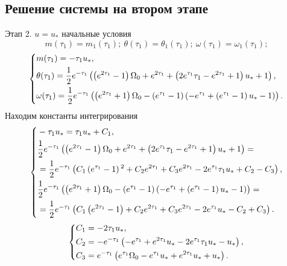 \documentclass[a4paper,12pt, openany]{book}
\theoremstyle{plain} %
\theoremstyle{definition} %
\theoremstyle{remark} %
\numberwithin{equation}{chapter}
\begin{document}
{\subsection{Решение системы на втором этапе}
Этап 2. $u=u_*$ начальные условия
\[
    m(\tau_1)=m_1(\tau_1); \ \theta(\tau_1)=\theta_1(\tau_1);\ \omega(\tau_1)=\omega_1(\tau_1);
\]
\[
    \left\{ {\begin{aligned}
                 & m(\tau_1) = -\tau _1 u_*, \hfill                                                            \\
                 & \theta(\tau_1) = \frac{1}{2} e^{-\tau _1} \left(\left(e^{2 \tau _1}-1\right) \Omega _0+e^{2
                \tau _1}+\left(2 e^{\tau _1} \tau _1-e^{2 \tau _1}+1\right) u_*+1\right) , \hfill              \\
                 & \omega(\tau_1) = \frac{1}{2} e^{-\tau _1} \left(\left(e^{2 \tau _1}+1\right) \Omega
                _0-\left(e^{\tau _1}-1\right) \left(-e^{\tau _1}+\left(e^{\tau
                _1}-1\right) u_*-1\right)\right) . \hfill                                                      \\
            \end{aligned}} \right.
\]
Находим константы интегрирования
\[
    \left\{ {\begin{aligned}
                 & -\tau _1 u_* = \tau _1 u_*+C_1, \hfill                                         \\
                 & \frac{1}{2} e^{-\tau _1} \left(\left(e^{2 \tau _1}-1\right) \Omega _0+e^{2
                \tau _1}+\left(2 e^{\tau _1} \tau _1-e^{2 \tau _1}+1\right) u_*+1\right) =        \\
                 & = \frac{1}{2} e^{-\tau _1} \left(C_1 \left(e^{\tau _1}-1\right){}^2+C_2 e^{2
                \tau _1}+C_3 e^{2 \tau _1}-2 e^{\tau _1} \tau _1 u_*+C_2-C_3\right) , \hfill      \\
                 & \frac{1}{2} e^{-\tau _1} \left(\left(e^{2 \tau _1}+1\right) \Omega
                _0-\left(e^{\tau _1}-1\right) \left(-e^{\tau _1}+\left(e^{\tau
                _1}-1\right) u_*-1\right)\right)=                                                 \\
                 & =\frac{1}{2} e^{-\tau _1} \left(C_1 \left(e^{2 \tau _1}-1\right)+C_2 e^{2 \tau
                _1}+C_3 e^{2 \tau _1}-2 e^{\tau _1} u_*-C_2+C_3\right)  . \hfill                  \\
            \end{aligned}} \right.
\]
\[
    \left\{ {\begin{aligned}
                 & C_1 =-2 \tau _1 u_*, \hfill                                                    \\
                 & C_2 = -e^{-\tau _1} \left(-e^{\tau _1}+e^{2 \tau _1} u_*-2 e^{\tau _1} \tau _1
                u_*-u_*\right), \hfill                                                            \\
                 & C_3 = e^{-\tau _1} \left(e^{\tau _1} \Omega _0-e^{\tau _1} u_*+e^{2 \tau _1}
                u_*+u_*\right). \hfill                                                            \\
            \end{aligned}} \right.
\]

}
\end{document}
